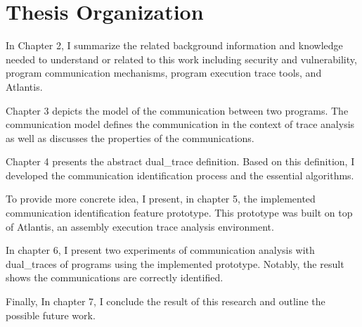 \section{Thesis Organization}
In Chapter 2, I summarize the related background information and knowledge needed to understand or related to this work including security and vulnerability, program communication mechanisms, program execution trace tools, and Atlantis. 

Chapter 3 depicts the model of the communication between two programs. The communication model defines the communication in the context of trace analysis as well as discusses the properties of the communications. 

Chapter 4 presents the abstract dual\_trace definition. Based on this definition, I developed the communication identification process and the essential algorithms.

To provide more concrete idea, I present, in chapter 5, the implemented communication identification feature prototype. This prototype was built on top of Atlantis\cite{huang2017atlantis}, an assembly execution trace analysis environment.

In chapter 6, I present two experiments of communication analysis with dual\_traces of programs using the implemented prototype. Notably, the result shows the communications are correctly identified. 

Finally, In chapter 7, I conclude the result of this research and outline the possible future work.